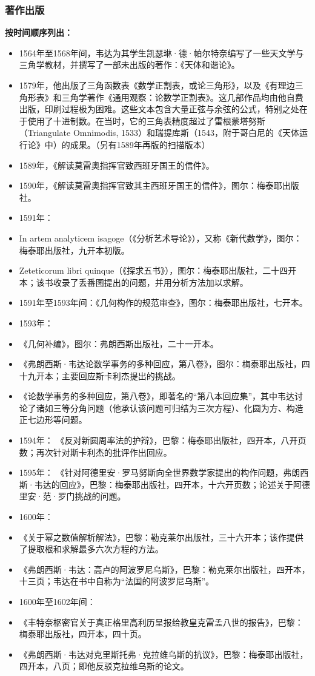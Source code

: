 \subsubsection{著作出版}
\textbf{按时间顺序列出：}
\begin{itemize}
\item 1564年至1568年间，韦达为其学生凯瑟琳·德·帕尔特奈编写了一些天文学与三角学教材，并撰写了一部未出版的著作：《天体和谐论》。
\item 1579年，他出版了三角函数表《数学正割表，或论三角形》，以及《有理边三角形表》和三角学著作《通用观察：论数学正割表》。这几部作品均由他自费出版，印刷过程极为困难。这些文本包含大量正弦与余弦的公式，特别之处在于使用了十进制数。在当时，它的三角表精度超过了雷根蒙塔努斯（Triangulate Omnimodis, 1533）和瑞提库斯（1543，附于哥白尼的《天体运行论》中）的成果。（另有1589年再版的扫描版本）
\item 1589年，《解读莫雷奥指挥官致西班牙国王的信件》。
\item 1590年，《解读莫雷奥指挥官致其主西班牙国王的信件》，图尔：梅泰耶出版社。
\item 1591年：
\item In artem analyticem isagoge（《分析艺术导论》），又称《新代数学》，图尔：梅泰耶出版社，九开本初版。
\item Zeteticorum libri quinque（《探求五书》），图尔：梅泰耶出版社，二十四开本；该书收录了丢番图提出的问题，并用分析方法加以求解。
\item 1591年至1593年间：《几何构作的规范审查》，图尔：梅泰耶出版社，七开本。
\item 1593年：
\item 《几何补编》，图尔：弗朗西斯出版社，二十一开本。
\item 《弗朗西斯·韦达论数学事务的多种回应，第八卷》，图尔：梅泰耶出版社，四十九开本；主要回应斯卡利杰提出的挑战。
\item 《论数学事务的多种回应，第八卷》，即著名的“第八本回应集”，其中韦达讨论了诸如三等分角问题（他承认该问题可归结为三次方程）、化圆为方、构造正七边形等问题。
\item 1594年：
  《反对新圆周率法的护辩》，巴黎：梅泰耶出版社，四开本，八开页数；再次针对斯卡利杰的批评作出回应。
\item 1595年：
  《针对阿德里安·罗马努斯向全世界数学家提出的构作问题，弗朗西斯·韦达的回应》，巴黎：梅泰耶出版社，四开本，十六开页数；论述关于阿德里安·范·罗门挑战的问题。
\item 1600年：
\item 《关于幂之数值解析解法》，巴黎：勒克莱尔出版社，三十六开本；该作提供了提取根和求解最多六次方程的方法。
\item 《弗朗西斯·韦达：高卢的阿波罗尼乌斯》，巴黎：勒克莱尔出版社，四开本，十三页；韦达在书中自称为“法国的阿波罗尼乌斯”。
\item 1600年至1602年间：
\item 《丰特奈枢密官关于真正格里高利历呈报给教皇克雷孟八世的报告》，巴黎：梅泰耶出版社，四开本，四十页。
\item 《弗朗西斯·韦达对克里斯托弗·克拉维乌斯的抗议》，巴黎：梅泰耶出版社，四开本，八页；即他反驳克拉维乌斯的论文。
\end{itemize}
